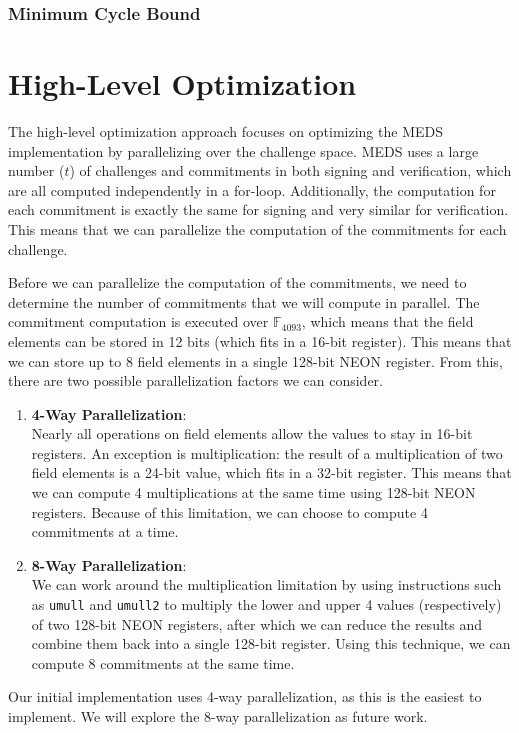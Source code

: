 \documentclass[11pt,a4paper]{report}
\theoremstyle{definition}
\begin{document}
\subsubsection{Minimum Cycle Bound}

\section{High-Level Optimization}
\label{sec:highleveloptimization}
The high-level optimization approach focuses on optimizing the MEDS implementation by parallelizing over the challenge space. MEDS uses a large number ($t$) of challenges and commitments in both signing and verification, which are all computed independently in a for-loop. Additionally, the computation for each commitment is exactly the same for signing and very similar for verification. This means that we can parallelize the computation of the commitments for each challenge.

Before we can parallelize the computation of the commitments, we need to determine the number of commitments that we will compute in parallel. The commitment computation is executed over $\mathbb{F}_{4093}$, which means that the field elements can be stored in 12 bits (which fits in a 16-bit register). This means that we can store up to 8 field elements in a single 128-bit NEON register. From this, there are two possible parallelization factors we can consider.
\begin{enumerate}
  \item \textbf{4-Way Parallelization}:\\
  Nearly all operations on field elements allow the values to stay in 16-bit registers. An exception is multiplication: the result of a multiplication of two field elements is a 24-bit value, which fits in a 32-bit register. This means that we can compute 4 multiplications at the same time using 128-bit NEON registers. Because of this limitation, we can choose to compute 4 commitments at a time.
  \item \textbf{8-Way Parallelization}:\\
  We can work around the multiplication limitation by using instructions such as \texttt{umull} and \texttt{umull2} to multiply the lower and upper 4 values (respectively) of two 128-bit NEON registers, after which we can reduce the results and combine them back into a single 128-bit register. Using this technique, we can compute 8 commitments at the same time.
\end{enumerate}
Our initial implementation uses 4-way parallelization, as this is the easiest to implement. We will explore the 8-way parallelization as future work.
\end{document}

